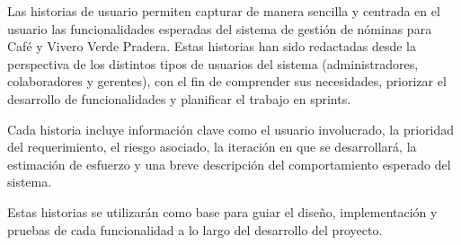 Las historias de usuario permiten capturar de manera sencilla y centrada en el usuario las funcionalidades esperadas del sistema de gestión de nóminas para Café y Vivero Verde Pradera. Estas historias han sido redactadas desde la perspectiva de los distintos tipos de usuarios del sistema (administradores, colaboradores y gerentes), con el fin de comprender sus necesidades, priorizar el desarrollo de funcionalidades y planificar el trabajo en sprints.

Cada historia incluye información clave como el usuario involucrado, la prioridad del requerimiento, el riesgo asociado, la iteración en que se desarrollará, la estimación de esfuerzo y una breve descripción del comportamiento esperado del sistema.

Estas historias se utilizarán como base para guiar el diseño, implementación y pruebas de cada funcionalidad a lo largo del desarrollo del proyecto.

